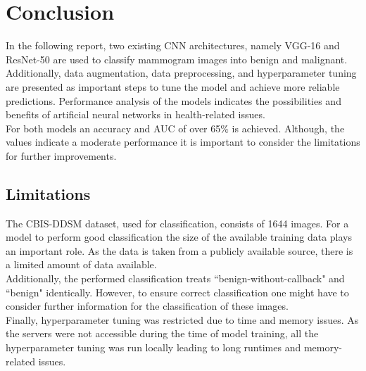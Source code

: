 \documentclass[sn-mathphys,Numbered]{sn-jnl}%
\theoremstyle{thmstyleone}%
\theoremstyle{thmstyletwo}%
\theoremstyle{thmstylethree}%
\begin{document}
\section{Conclusion}
\label{conclusion}
In the following report, two existing CNN architectures, namely VGG-16 and ResNet-50 are used to classify mammogram images into benign and malignant.\\
Additionally, data augmentation, data preprocessing, and hyperparameter tuning are presented as important steps to tune the model and achieve more reliable predictions.
Performance analysis of the models indicates the possibilities and benefits of artificial neural networks in health-related issues. \\
For both models an accuracy and AUC of over 65\% is achieved.
Although, the values indicate a moderate performance it is important to consider the limitations for further improvements.
\subsection{Limitations}
\label{limitation}
The CBIS-DDSM dataset, used for classification, consists of 1644 images. For a model to perform good classification the size of the available training data plays an important role. As the data is taken from a publicly available source, there is a limited amount of data available. \\
Additionally, the performed classification treats ``benign-without-callback"  and ``benign" identically. However, to ensure correct classification one might have to consider further information for the classification of these images.\\
Finally, hyperparameter tuning was restricted due to time and memory issues. As the servers were not accessible during the time of model training, all the hyperparameter tuning was run locally leading to long runtimes and memory-related issues.

\end{document}
